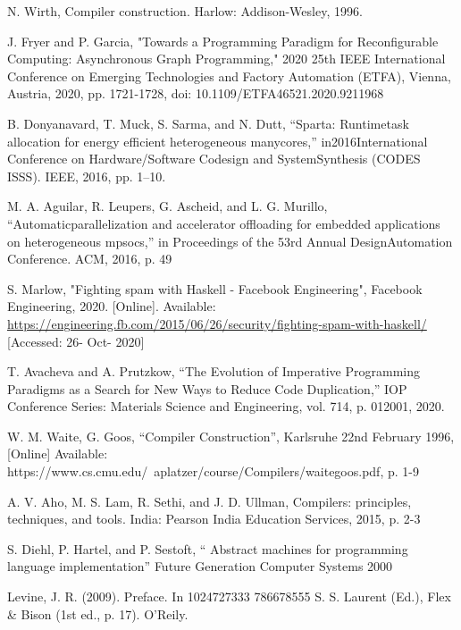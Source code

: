 \documentclass[11pt]{article}
\begin{document}
\begin{thebibliography}{9}

\bibitem{} 
N. Wirth, Compiler construction. Harlow: Addison-Wesley, 1996.

\bibitem{} 
J. Fryer and P. Garcia, "Towards a Programming Paradigm for Reconfigurable Computing: Asynchronous Graph Programming," 2020 25th IEEE International Conference on Emerging Technologies and Factory Automation (ETFA), Vienna, Austria, 2020, pp. 1721-1728, doi: 10.1109/ETFA46521.2020.9211968

\bibitem{}
B. Donyanavard, T. Muck, S. Sarma, and N. Dutt, “Sparta: Runtimetask allocation for energy efficient heterogeneous manycores,” in2016International Conference on Hardware/Software Codesign and SystemSynthesis (CODES  ISSS). IEEE, 2016, pp. 1–10.

\bibitem{}
M. A. Aguilar, R. Leupers, G. Ascheid, and L. G. Murillo, “Automaticparallelization and accelerator offloading for embedded applications on heterogeneous mpsocs,” in Proceedings of the 53rd Annual DesignAutomation Conference. ACM, 2016, p. 49

\bibitem{} 
S. Marlow, "Fighting spam with Haskell - Facebook Engineering", Facebook Engineering, 2020. [Online]. Available: \url{https://engineering.fb.com/2015/06/26/security/fighting-spam-with-haskell/} 
[Accessed: 26- Oct- 2020]

\bibitem{}
T. Avacheva and A. Prutzkow, “The Evolution of Imperative Programming Paradigms as a Search for New Ways to Reduce Code Duplication,” IOP Conference Series: Materials Science and Engineering, vol. 714, p. 012001, 2020.

\bibitem{}
W. M. Waite, G. Goos, “Compiler Construction”, Karlsruhe 22nd February 1996, [Online] Available: https://www.cs.cmu.edu/~aplatzer/course/Compilers/waitegoos.pdf, p. 1-9

\bibitem{}
A. V. Aho, M. S. Lam, R. Sethi, and J. D. Ullman, Compilers: principles, techniques, and tools. India: Pearson India Education Services, 2015, p. 2-3

\bibitem{}
S. Diehl, P. Hartel, and P. Sestoft, “ Abstract machines for programming language implementation” Future Generation Computer Systems 2000


\bibitem{}
Levine, J. R. (2009). Preface. In 1024727333 786678555 S. S. Laurent (Ed.), Flex \& Bison (1st ed., p. 17). O'Reily.



\end{thebibliography}
\end{document}
